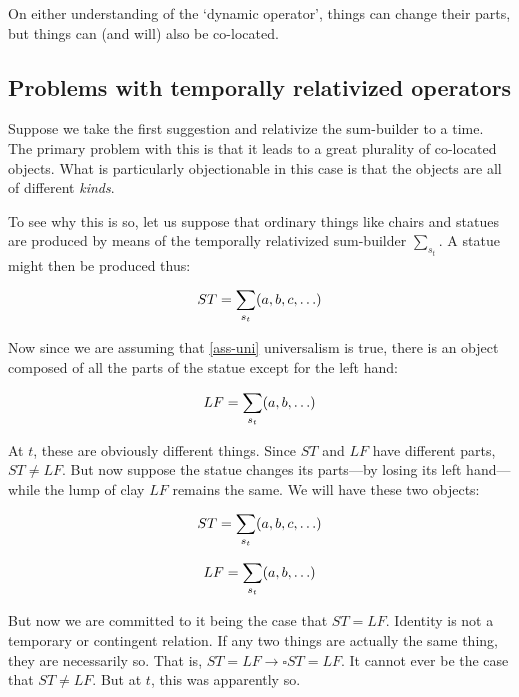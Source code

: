 \documentclass[11pt]{article}
\begin{document}
\begin{spacing}{1.5}
On either understanding of the `dynamic operator', things can change
their parts, but things can (and will) also be co-located.

\subsection{Problems with temporally relativized operators}
\label{problems2a}
Suppose we take the first suggestion and relativize the sum-builder to
a time.  The primary problem with this is that it leads to a great
plurality of co-located objects.  What is particularly objectionable
in this case is that the objects are all of different {\em kinds}.

To see why this is so, let us suppose that ordinary things like chairs
and statues are produced by means of the temporally relativized
sum-builder $\sum_{s_t}$.  A statue might then be produced thus:

\begin{displaymath}
ST = \sum_{s_t} (a, b, c, \mathellipsis )
\end{displaymath}

Now since we are assuming that \ref{ass-uni} universalism is true,
there is an object composed of all the parts of the statue except for
the left hand:

\begin{displaymath}
LF = \sum_{s_t} (a, b, \mathellipsis )
\end{displaymath}

At $t$, these are obviously different things.  Since $ST$ and $LF$
have different parts, $ST \neq LF$.  But now suppose the statue
changes its parts---by losing its left hand---while the lump of clay
$LF$ remains the same.  We will have these two objects:

\begin{displaymath}
ST = \sum_{s_t} (a, b, c, \mathellipsis )
\end{displaymath}

\begin{displaymath}
LF = \sum_{s_t} (a, b, \mathellipsis )
\end{displaymath}

But now we are committed to it being the case that $ST = LF$.
Identity is not a temporary or contingent relation.  If any two things
are actually the same thing, they are necessarily so.  That is, $ST =
LF \rightarrow \square ST = LF$.  It cannot ever be the case that $ST
\neq LF$.  But at $t$, this was apparently so.


\end{spacing}
\end{document}
